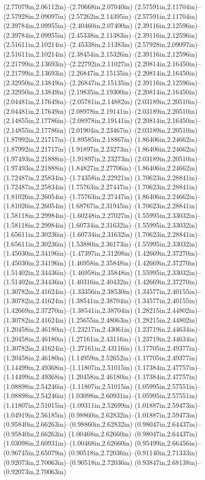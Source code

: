 (2.77079in,2.06112in)--(2.70668in,2.07040in) (2.57591in,2.11704in)--(2.57928in,2.09097in) (2.57262in,2.14395in)--(2.57591in,2.11704in) (2.39784in,2.09955in)--(2.40460in,2.07400in) (2.39116in,2.12596in)--(2.39784in,2.09955in) (2.45338in,2.11383in)--(2.39116in,2.12596in) (2.51611in,2.10214in)--(2.45338in,2.11383in) (2.57928in,2.09097in)--(2.51611in,2.10214in) (2.38454in,2.15326in)--(2.39116in,2.12596in) (2.21799in,2.13693in)--(2.22792in,2.11027in) (2.20814in,2.16450in)--(2.21799in,2.13693in) (2.26847in,2.15135in)--(2.20814in,2.16450in) (2.32950in,2.13849in)--(2.26847in,2.15135in) (2.39116in,2.12596in)--(2.32950in,2.13849in) (2.19835in,2.19300in)--(2.20814in,2.16450in) (2.04481in,2.17649in)--(2.05781in,2.14882in) (2.03189in,2.20510in)--(2.04481in,2.17649in) (2.08978in,2.19141in)--(2.03189in,2.20510in) (2.14855in,2.17786in)--(2.08978in,2.19141in) (2.20814in,2.16450in)--(2.14855in,2.17786in) (2.01904in,2.23467in)--(2.03189in,2.20510in) (1.87992in,2.21717in)--(1.89585in,2.18867in) (1.86406in,2.24662in)--(1.87992in,2.21717in) (1.91897in,2.23273in)--(1.86406in,2.24662in) (1.97493in,2.21888in)--(1.91897in,2.23273in) (2.03189in,2.20510in)--(1.97493in,2.21888in) (1.84827in,2.27706in)--(1.86406in,2.24662in) (1.72487in,2.25834in)--(1.74358in,2.22921in) (1.70623in,2.28841in)--(1.72487in,2.25834in) (1.75763in,2.27447in)--(1.70623in,2.28841in) (1.81026in,2.26054in)--(1.75763in,2.27447in) (1.86406in,2.24662in)--(1.81026in,2.26054in) (1.68767in,2.31945in)--(1.70623in,2.28841in) (1.58118in,2.29984in)--(1.60248in,2.27027in) (1.55995in,2.33032in)--(1.58118in,2.29984in) (1.60734in,2.31632in)--(1.55995in,2.33032in) (1.65611in,2.30236in)--(1.60734in,2.31632in) (1.70623in,2.28841in)--(1.65611in,2.30236in) (1.53880in,2.36173in)--(1.55995in,2.33032in) (1.45030in,2.34196in)--(1.47397in,2.31208in) (1.42669in,2.37270in)--(1.45030in,2.34196in) (1.46958in,2.35848in)--(1.42669in,2.37270in) (1.51402in,2.34436in)--(1.46958in,2.35848in) (1.55995in,2.33032in)--(1.51402in,2.34436in) (1.40316in,2.40432in)--(1.42669in,2.37270in) (1.30782in,2.41624in)--(1.33356in,2.38530in) (1.34577in,2.40155in)--(1.30782in,2.41624in) (1.38541in,2.38704in)--(1.34577in,2.40155in) (1.42669in,2.37270in)--(1.38541in,2.38704in) (1.28215in,2.44802in)--(1.30782in,2.41624in) (1.25655in,2.48063in)--(1.28215in,2.44802in) (1.20458in,2.46180in)--(1.23217in,2.43061in) (1.23719in,2.44634in)--(1.20458in,2.46180in) (1.27161in,2.43116in)--(1.23719in,2.44634in) (1.30782in,2.41624in)--(1.27161in,2.43116in) (1.17705in,2.49377in)--(1.20458in,2.46180in) (1.14959in,2.52652in)--(1.17705in,2.49377in) (1.14499in,2.49368in)--(1.11807in,2.51015in) (1.17384in,2.47757in)--(1.14499in,2.49368in) (1.20458in,2.46180in)--(1.17384in,2.47757in) (1.08898in,2.54246in)--(1.11807in,2.51015in) (1.05995in,2.57551in)--(1.08898in,2.54246in) (1.03098in,2.60931in)--(1.05995in,2.57551in) (1.11807in,2.51015in)--(1.09311in,2.52699in) (1.01887in,2.59473in)--(1.04919in,2.56185in) (0.98860in,2.62832in)--(1.01887in,2.59473in) (0.95840in,2.66263in)--(0.98860in,2.62832in) (0.98047in,2.64437in)--(0.95840in,2.66263in) (1.00468in,2.62660in)--(0.98047in,2.64437in) (1.03098in,2.60931in)--(1.00468in,2.62660in) (0.95499in,2.66456in)--(0.96745in,2.65079in) (0.90518in,2.72036in)--(0.91140in,2.71333in) (0.92073in,2.70063in)--(0.90518in,2.72036in) (0.93847in,2.68138in)--(0.92073in,2.70063in) 